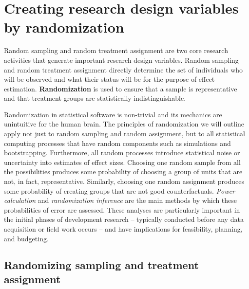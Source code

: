 \section{Creating research design variables by randomization}

Random sampling and random treatment assignment
are two core research activities
that generate important research design variables.
Random sampling and random treatment assignment directly determine
the set of individuals who will be observed
and what their status will be for the purpose of effect estimation.
\textbf{Randomization}
is used to ensure that a sample is representative and
that treatment groups are statistically indistinguishable.

Randomization in statistical software is non-trivial
and its mechanics are unintuitive for the human brain.
The principles of randomization we will outline
apply not just to random sampling and random assignment,
but to all statistical computing processes that have random components
such as simulations and bootstrapping.
Furthermore, all random processes introduce statistical noise
or uncertainty into estimates of effect sizes.
Choosing one random sample from all the possibilities produces some probability of
choosing a group of units that are not, in fact, representative.
Similarly, choosing one random assignment produces some probability of
creating groups that are not good counterfactuals.
\textit{Power calculation} and \textit{randomization inference}
are the main methods by which these probabilities of error are assessed.
These analyses are particularly important in the initial phases of development research --
typically conducted before any data acquisition or field work occurs --
and have implications for feasibility, planning, and budgeting.

\subsection{Randomizing sampling and treatment assignment}

